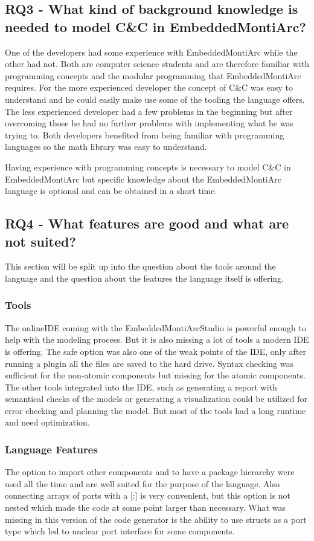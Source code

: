 \subsection{RQ3 - What kind of background knowledge is needed to model C\&C in EmbeddedMontiArc?}
One of the developers had some experience with EmbeddedMontiArc while the other had not. Both are computer science students and are therefore familiar with programming concepts and the modular programming that EmbeddedMontiArc requires. For the more experienced developer the concept of C\&C was easy to understand and he could easily make use some of the tooling the language offers. The less experienced developer had a few problems in the beginning but after overcoming those he had no further problems with implementing what he was trying to. Both developers benefited from being familiar with programming languages so the math library was easy to understand. 

Having experience with programming concepts is necessary to model C\&C in EmbeddedMontiArc but specific knowledge about the EmbeddedMontiArc language is optional and can be obtained in a short time.

\subsection{RQ4 - What features are good and what are not suited?}
This section will be split up into the question about the tools around the language and the question about the features the language itself is offering.

\subsubsection{Tools}
The onlineIDE coming with the EmbeddedMontiArcStudio is powerful enough to help with the modeling process. But it is also missing a lot of tools a modern IDE is offering. The safe option was also one of the weak points of the IDE, only after running a plugin all the files are saved to the hard drive. Syntax checking was sufficient for the non-atomic components but missing for the atomic components. The other tools integrated into the IDE, such as generating a report with semantical checks of the models or generating a visualization could be utilized for error checking and planning the model. But most of the tools had a long runtime and need optimization.

\subsubsection{Language Features}
The option to import other components and to have a package hierarchy were used all the time and are well suited for the purpose of the language. Also connecting arrays of ports with a [:] is very convenient, but this option is not nested which made the code at some point larger than necessary. What was missing in this version of the code generator is the ability to use structs as a port type which led to unclear port interface for some components.

